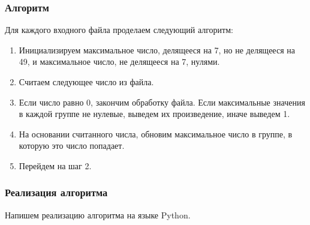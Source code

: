 \documentclass{beamer}
\begin{document}
\begin{frame}

    \frametitle{Алгоритм}

    Для каждого входного файла проделаем следующий алгоритм:

    \begin{enumerate}

        \item Инициализируем максимальное число, делящееся на 7, но не делящееся на 49, и максимальное число, не делящееся на 7, нулями.

        \item Считаем следующее число из файла.

        \item Если число равно 0, закончим обработку файла. Если максимальные значения в каждой группе не нулевые, выведем их произведение, иначе выведем 1.

        \item На основании считанного числа, обновим максимальное число в группе, в которую это число попадает.

        \item Перейдем на шаг 2.

    \end{enumerate}

\end{frame}

\begin{frame}

    \frametitle{Реализация алгоритма}

    Напишем реализацию алгоритма на языке Python.

    \inputminted[frame=single, fontsize=\footnotesize]{python}{src/task_27/solution.py}

\end{frame}
\end{document}

